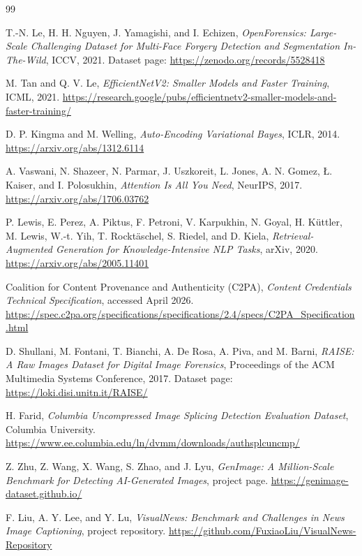 \documentclass[11pt]{article}
\begin{document}
\begin{thebibliography}{99}

T.-N. Le, H. H. Nguyen, J. Yamagishi, and I. Echizen,
\emph{OpenForensics: Large-Scale Challenging Dataset for Multi-Face Forgery Detection and Segmentation In-The-Wild},
ICCV, 2021.
Dataset page: \url{https://zenodo.org/records/5528418}

M. Tan and Q. V. Le,
\emph{EfficientNetV2: Smaller Models and Faster Training},
ICML, 2021.
\url{https://research.google/pubs/efficientnetv2-smaller-models-and-faster-training/}

D. P. Kingma and M. Welling,
\emph{Auto-Encoding Variational Bayes},
ICLR, 2014.
\url{https://arxiv.org/abs/1312.6114}

A. Vaswani, N. Shazeer, N. Parmar, J. Uszkoreit, L. Jones, A. N. Gomez, {\L}. Kaiser, and I. Polosukhin,
\emph{Attention Is All You Need},
NeurIPS, 2017.
\url{https://arxiv.org/abs/1706.03762}

P. Lewis, E. Perez, A. Piktus, F. Petroni, V. Karpukhin, N. Goyal, H. K\"uttler, M. Lewis, W.-t. Yih, T. Rockt\"aschel, S. Riedel, and D. Kiela,
\emph{Retrieval-Augmented Generation for Knowledge-Intensive NLP Tasks},
arXiv, 2020.
\url{https://arxiv.org/abs/2005.11401}

Coalition for Content Provenance and Authenticity (C2PA),
\emph{Content Credentials Technical Specification},
accessed April 2026.
\url{https://spec.c2pa.org/specifications/specifications/2.4/specs/C2PA_Specification.html}

D. Shullani, M. Fontani, T. Bianchi, A. De Rosa, A. Piva, and M. Barni,
\emph{RAISE: A Raw Images Dataset for Digital Image Forensics},
Proceedings of the ACM Multimedia Systems Conference, 2017.
Dataset page: \url{https://loki.disi.unitn.it/RAISE/}

H. Farid,
\emph{Columbia Uncompressed Image Splicing Detection Evaluation Dataset},
Columbia University.
\url{https://www.ee.columbia.edu/ln/dvmm/downloads/authsplcuncmp/}

Z. Zhu, Z. Wang, X. Wang, S. Zhao, and J. Lyu,
\emph{GenImage: A Million-Scale Benchmark for Detecting AI-Generated Images},
project page.
\url{https://genimage-dataset.github.io/}

F. Liu, A. Y. Lee, and Y. Lu,
\emph{VisualNews: Benchmark and Challenges in News Image Captioning},
project repository.
\url{https://github.com/FuxiaoLiu/VisualNews-Repository}


\end{thebibliography}
\end{document}

